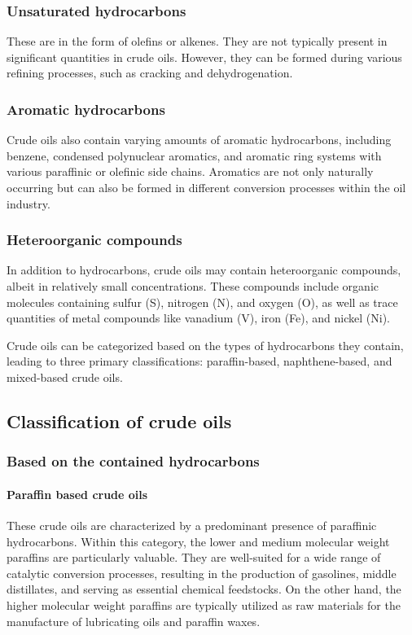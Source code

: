 \subsubsection{Unsaturated hydrocarbons} These are in the form of olefins or alkenes.
They are not typically present in significant quantities in crude oils.
However, they can be formed during various refining processes, such as cracking and dehydrogenation.

\subsubsection{Aromatic hydrocarbons} Crude oils also contain varying amounts of aromatic hydrocarbons, including benzene, condensed polynuclear aromatics, and aromatic ring systems with various paraffinic or olefinic side chains.
Aromatics are not only naturally occurring but can also be formed in different conversion processes within the oil industry.

\subsubsection{Heteroorganic compounds}
In addition to hydrocarbons, crude oils may contain heteroorganic compounds, albeit in relatively small concentrations.
These compounds include organic molecules containing sulfur (S), nitrogen (N), and oxygen (O), as well as trace quantities of metal compounds like vanadium (V), iron (Fe), and nickel (Ni).

Crude oils can be categorized based on the types of hydrocarbons they contain, leading to three primary classifications: paraffin-based, naphthene-based, and mixed-based crude oils.

\subsection{Classification of crude oils}

\subsubsection{Based on the contained hydrocarbons}

\paragraph{Paraffin based crude oils}
These crude oils are characterized by a predominant presence of paraffinic hydrocarbons.
Within this category, the lower and medium molecular weight paraffins are particularly valuable.
They are well-suited for a wide range of catalytic conversion processes, resulting in the production of gasolines, middle distillates, and serving as essential chemical feedstocks.
On the other hand, the higher molecular weight paraffins are typically utilized as raw materials for the manufacture of lubricating oils and paraffin waxes.

